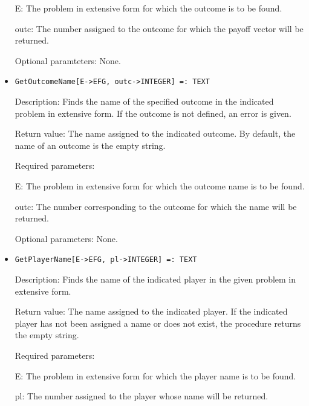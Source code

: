 \begin{itemize}
\bd
\item
[ E:] The problem in extensive form for which the outcome is to be found.
\item
[ outc:] The number assigned to the outcome for which the payoff 
vector will be returned.
\ed

\item
[Optional paramteters:] None.
\ed

\item
\protect \large \begin{verbatim}
GetOutcomeName[E->EFG, outc->INTEGER] =: TEXT
\end{verbatim}\normalsize

\bd

\item
[Description:] Finds the name of the specified outcome in the indicated
problem in extensive form.  If the outcome is not defined, an error is
given.
\item
[Return value:] The name assigned to the indicated outcome.  By default,
the name of an outcome is the empty string.
\item
[Required parameters:]\hfil\null

\bd
\item	  
[ E:] The problem in extensive form for which the outcome name is to
be found.
\item
[ outc:] The number corresponding to the outcome for which the name 
will be returned.
\ed

\item
[Optional parameters:] None.
\ed

\item
\protect \large \begin{verbatim}
GetPlayerName[E->EFG, pl->INTEGER] =: TEXT
\end{verbatim}\normalsize

\bd
\item
[Description:] Finds the name of the indicated player in the given 
problem in extensive form.
\item
[Return value:] The name assigned to the indicated player.  If the 
indicated player has not been assigned a name or does not exist, the
procedure returns the empty string.
\item
[Required parameters:]\hfil\null

\bd
\item  
[ E:] The problem in extensive form for which the player name is to
be found.
\item
[ pl:] The number assigned to the player whose name will be 
returned.
\ed


\end{itemize}

